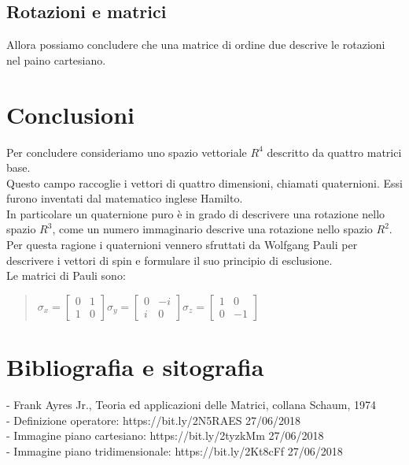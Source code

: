 \documentclass[a4paper]{article}
\begin{document}
\subsection{Rotazioni e matrici}
Allora possiamo concludere che una matrice di ordine due descrive le rotazioni nel paino cartesiano.
\section{Conclusioni}
Per concludere consideriamo uno spazio vettoriale $R^4$ descritto da quattro matrici base.
\\Questo campo raccoglie i vettori di quattro dimensioni, chiamati quaternioni. Essi furono inventati dal matematico inglese Hamilto.
\\In particolare un quaternione puro è in grado di descrivere una rotazione nello spazio $R^3$, come un numero immaginario descrive una rotazione nello spazio $R^2$. Per questa ragione i quaternioni vennero sfruttati da Wolfgang Pauli per descrivere i vettori di spin e formulare il suo principio di esclusione.
\\
Le matrici di Pauli sono:
\begin{quote} \centering$\sigma_{x}=\left[\begin{matrix}0&1\\ 1&0 \end{matrix}\right] \sigma_{y}=\left[\begin{matrix}0&-\textit{i}\\ \textit{i}&0 \end{matrix}\right] \sigma_{z}=\left[\begin{matrix}1&0\\ 0&-1 \end{matrix}\right]
$\end{quote}

\section{Bibliografia e sitografia}
- Frank Ayres Jr., Teoria ed applicazioni delle Matrici, collana Schaum, 1974\\
- Definizione operatore: https://bit.ly/2N5RAES 27/06/2018\\
- Immagine piano cartesiano: https://bit.ly/2tyzkMm 27/06/2018\\
- Immagine piano tridimensionale: https://bit.ly/2Kt8cFf 27/06/2018
\end{document}
